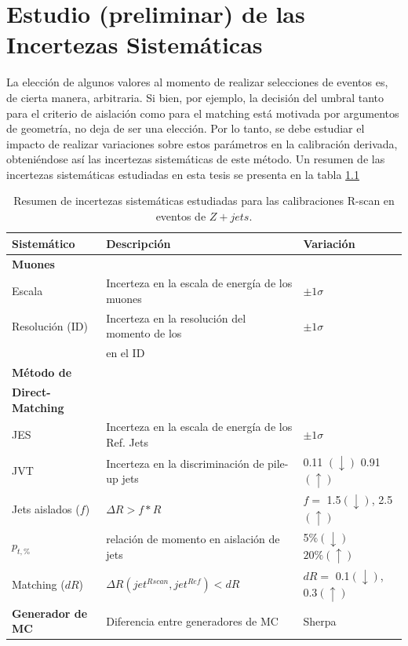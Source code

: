 \chapter{Estudio (preliminar) de las Incertezas Sistemáticas}\label{Syst}

La elección de algunos valores al momento de realizar selecciones de eventos es, de cierta manera, arbitraria. Si bien, por ejemplo, la decisión del umbral tanto para el criterio de aislación como para el matching está motivada por argumentos de geometría, no deja de ser una elección. Por lo tanto, se debe estudiar el impacto de realizar variaciones sobre estos parámetros en la calibración derivada, obteniéndose así las incertezas sistemáticas de este método. Un resumen de las incertezas sistemáticas estudiadas en esta tesis se presenta en la tabla \ref{tab:syst}


\begin{table}[ht]
    \centering
    \begin{tabular}{|l|l|l|} 
        \hline
        Sistemático & Descripción & Variación \\ \hline\hline
        \textbf{Muones} & &\\
        Escala & Incerteza en la escala de energía de los muones & $\pm 1\sigma$\\
        Resolución (ID) &  Incerteza en la resolución del momento de los & $\pm 1\sigma$\\
        & en el ID & \\ \hline
        \textbf{Método de} & &\\
        \textbf{Direct-Matching} &  &\\ 
        JES & Incerteza en la escala de energía de los Ref. Jets & $\pm 1\sigma$\\ 
        JVT & Incerteza en la discriminación de pile-up jets & 0.11 $(\downarrow)$ 0.91 $(\uparrow)$ \\
        Jets aislados ($f$) & $\Delta R> f*R$ & $f=$ 1.5$(\downarrow)$, 2.5$(\uparrow)$ \\
        $p_{t,\%}$ & relación de momento en aislación de jets & 5$\%(\downarrow)$ $20\%(\uparrow)$ \\
        Matching ($dR$) & $\Delta R(jet^{Rscan},jet^{Ref})<dR$ & $dR=$ 0.1$(\downarrow)$, 0.3$(\uparrow)$ \\ \hline 
        \textbf{Generador de MC}& Diferencia entre generadores de MC & Sherpa \\ \hline 
        \end{tabular}
    \caption{Resumen de incertezas sistemáticas estudiadas para las calibraciones R-scan en eventos de $Z+jets$.}
    \label{tab:syst}
\end{table}


